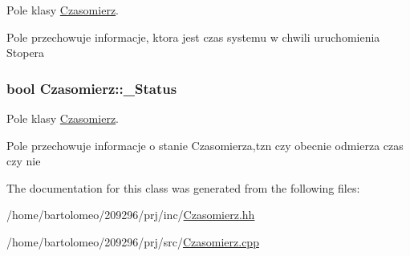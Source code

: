 Pole klasy \hyperlink{class_czasomierz}{Czasomierz}. 

Pole przechowuje informacje, ktora jest czas systemu w chwili uruchomienia Stopera \hypertarget{class_czasomierz_a5eb9aa3fd9f0fb8af343f2865d490e64}{
\subsubsection[{\-\_\-\-Status}]{\setlength{\rightskip}{0pt plus 5cm}bool Czasomierz\-::\-\_\-\-Status\hspace{0.3cm}{\ttfamily [private]}}}\label{class_czasomierz_a5eb9aa3fd9f0fb8af343f2865d490e64}


Pole klasy \hyperlink{class_czasomierz}{Czasomierz}. 

Pole przechowuje informacje o stanie Czasomierza,tzn czy obecnie odmierza czas czy nie 

The documentation for this class was generated from the following files\-:\begin{DoxyCompactItemize}
\item 
/home/bartolomeo/209296/prj/inc/\hyperlink{_czasomierz_8hh}{Czasomierz.\-hh}\item 
/home/bartolomeo/209296/prj/src/\hyperlink{_czasomierz_8cpp}{Czasomierz.\-cpp}\end{DoxyCompactItemize}
